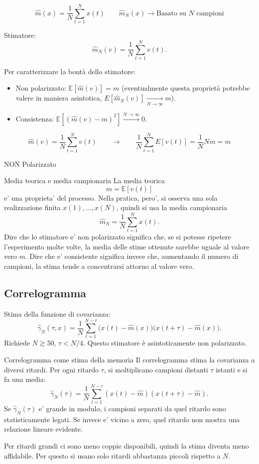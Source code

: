 \documentclass[11pt,a4paper]{article}
\begin{document}
\[
\hat m(x)=\frac{1}{N}\sum_{t=1}^{N}x(t)
\qquad
\hat m_N(x) \rightarrow \text{Basato su $N$ campioni}
\]


Stimatore:
\[
\hat m_N(v)=\frac{1}{N}\sum_{t=1}^{N} v(t).
\]

Per caratterizzare la bontà dello stimatore:
\begin{itemize}
  \item Non polarizzato: $\mathbb{E}[\hat m(v)]=m$ (eventualmente questa proprietà potrebbe valere in maniera asintotica, $E[\hat m_N(v)]\xrightarrow[N\to\infty]{} m$).
  \item Consistenza: $\mathbb{E}[(\hat m(v)-m)^2]\xrightarrow{N\to\infty}0$.
\end{itemize}

\[
\hat m(v)=\frac{1}{N}\sum_{t=1}^{N}v(t)
\qquad\to\qquad
\frac{1}{N}\sum_{t=1}^{N}E[v(t)]
=
\frac{1}{N}Nm
=
m
\]

\hfill NON Polarizzato

\begin{spiegazione}{Media teorica e media campionaria}
La media teorica
\[
m=\mathbb E[v(t)]
\]
e' una proprieta' del processo. Nella pratica, pero', si osserva una sola realizzazione finita $x(1),\dots,x(N)$, quindi si usa la media campionaria
\[
\hat m_N=\frac{1}{N}\sum_{t=1}^{N}x(t).
\]
Dire che lo stimatore e' non polarizzato significa che, se si potesse ripetere l'esperimento molte volte, la media delle stime ottenute sarebbe uguale al valore vero $m$. Dire che e' consistente significa invece che, aumentando il numero di campioni, la stima tende a concentrarsi attorno al valore vero.
\end{spiegazione}



\subsection{Correlogramma}
Stima della funzione di covarianza:
\[
\hat\gamma_N(\tau,x)=\frac{1}{N}\sum_{t=1}^{N-\tau}\bigl(x(t)-\hat m(x)\bigr)\bigl(x(t+\tau)-\hat m(x)\bigr).
\]
Richiede $N\gtrsim 50$, $\tau<N/4$. Questo stimatore è asintoticamente non polarizzato.

\begin{spiegazione}{Correlogramma come stima della memoria}
Il correlogramma stima la covarianza a diversi ritardi. Per ogni ritardo $\tau$, si moltiplicano campioni distanti $\tau$ istanti e si fa una media:
\[
\hat\gamma_N(\tau)=\frac{1}{N}\sum_{t=1}^{N-\tau}(x(t)-\hat m)(x(t+\tau)-\hat m).
\]
Se $\hat\gamma_N(\tau)$ e' grande in modulo, i campioni separati da quel ritardo sono statisticamente legati. Se invece e' vicino a zero, quel ritardo non mostra una relazione lineare evidente.

Per ritardi grandi ci sono meno coppie disponibili, quindi la stima diventa meno affidabile. Per questo si usano solo ritardi abbastanza piccoli rispetto a $N$.
\end{spiegazione}
\end{document}
